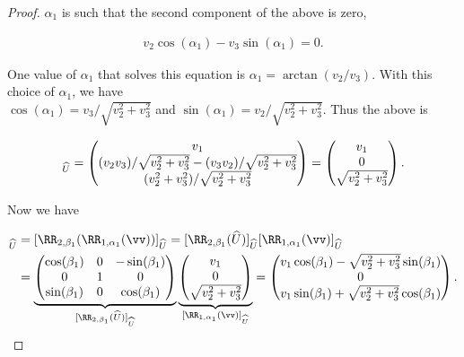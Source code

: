 \begin{proof}
    $\alpha_1$ is such that the second component of the above is zero,

    \begin{align*}
        v_2 \cos(\alpha_1) - v_3 \sin(\alpha_1) = 0.
    \end{align*}
    
    One value of $\alpha_1$ that solves this equation is $\alpha_1 = \arctan(v_2/v_3)$. With this choice of $\alpha_1$, we have \\ ${\cos(\alpha_1) = v_3/\sqrt{v_2^2 + v_3^2}}$ and ${\sin(\alpha_1) = v_2/\sqrt{v_2^2 + v_3^2}}$. Thus the above is
    
    \begin{align*}
        [\RR_{1, \alpha_1}(\vv)]_{\hU} =
        \begin{pmatrix}
            v_1 \\
            (v_2 v_3)/\sqrt{v_2^2 + v_3^2} - (v_3 v_2)/\sqrt{v_2^2 + v_3^2} \\
            (v_2^2 + v_3^2)/\sqrt{v_2^2 + v_3^2}
        \end{pmatrix}
        =
        \begin{pmatrix}
            v_1 \\
            0 \\
            \sqrt{v_2^2 + v_3^2}
        \end{pmatrix}.
    \end{align*}

    Now we have

    \begin{align*}
        [(\RR_{2, \beta_1} \circ \RR_{1, \alpha_1})(\vv)]_{\hU} &=
        [\RR_{2, \beta_1}(\RR_{1, \alpha_1}(\vv))]_{\hU} = [\RR_{2, \beta_1}(\hU)]_{\hU} [\RR_{1, \alpha_1}(\vv)]_{\hU} \\
        &=
        \underbrace
        {
            \begin{pmatrix}
                \cos(\beta_1) & 0 & -\sin(\beta_1) \\
                0 & 1 & 0 \\
                \sin(\beta_1) & 0 & \cos(\beta_1)
            \end{pmatrix}
        }_{[\RR_{2, \beta_1}(\hU)]_{\hU}}
        \underbrace
        {
            \begin{pmatrix}
                v_1 \\
                0 \\
                \sqrt{v_2^2 + v_3^2}
            \end{pmatrix}
        }_{[\RR_{1, \alpha_1}(\vv)]_{\hU}}
        =
        \begin{pmatrix}
            v_1 \cos(\beta_1) - \sqrt{v_2^2 + v_3^2} \sin(\beta_1) \\
            0 \\
            v_1 \sin(\beta_1) + \sqrt{v_2^2 + v_3^2} \cos(\beta_1)
        \end{pmatrix}.
    \end{align*}


\end{proof}
